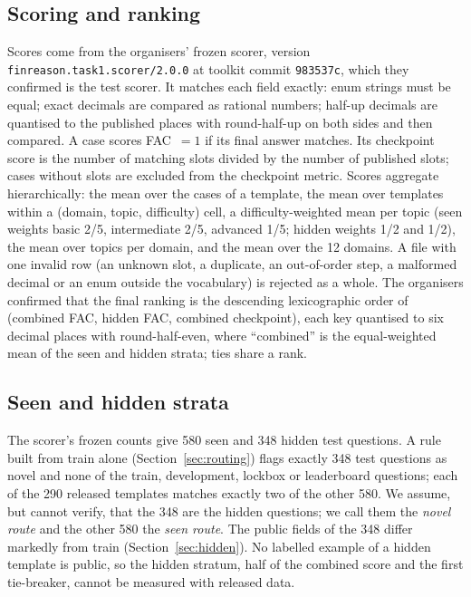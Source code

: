 \documentclass[conference]{IEEEtran}
\newcommand{\id}[1]{\texttt{#1}}
\begin{document}
\subsection{Scoring and ranking}
Scores come from the organisers' frozen scorer, version \id{finreason.task1.scorer/2.0.0} at toolkit commit \id{983537c}, which they confirmed is the test scorer. It matches each field exactly: enum strings must be equal; exact decimals are compared as rational numbers; half-up decimals are quantised to the published places with round-half-up on both sides and then compared. A case scores FAC~$=1$ if its final answer matches. Its checkpoint score is the number of matching slots divided by the number of published slots; cases without slots are excluded from the checkpoint metric. Scores aggregate hierarchically: the mean over the cases of a template, the mean over templates within a (domain, topic, difficulty) cell, a difficulty-weighted mean per topic (seen weights basic 2/5, intermediate 2/5, advanced 1/5; hidden weights 1/2 and 1/2), the mean over topics per domain, and the mean over the 12 domains. A file with one invalid row (an unknown slot, a duplicate, an out-of-order step, a malformed decimal or an enum outside the vocabulary) is rejected as a whole. The organisers confirmed that the final ranking is the descending lexicographic order of (combined FAC, hidden FAC, combined checkpoint), each key quantised to six decimal places with round-half-even, where ``combined'' is the equal-weighted mean of the seen and hidden strata; ties share a rank.

\subsection{Seen and hidden strata}\label{sec:strata}
The scorer's frozen counts give 580 seen and 348 hidden test questions. A rule built from train alone (Section~\ref{sec:routing}) flags exactly 348 test questions as novel and none of the train, development, lockbox or leaderboard questions; each of the 290 released templates matches exactly two of the other 580. We assume, but cannot verify, that the 348 are the hidden questions; we call them the \emph{novel route} and the other 580 the \emph{seen route}. The public fields of the 348 differ markedly from train (Section~\ref{sec:hidden}). No labelled example of a hidden template is public, so the hidden stratum, half of the combined score and the first tie-breaker, cannot be measured with released data.
\end{document}
